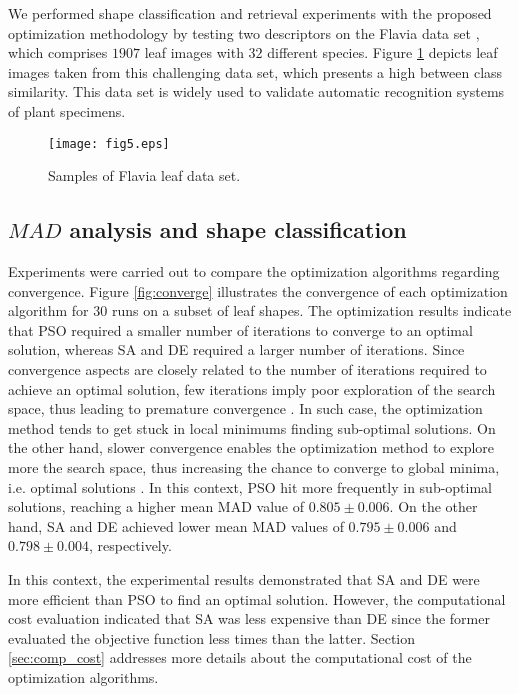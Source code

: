 We performed shape classification and retrieval experiments with the proposed optimization methodology by testing two descriptors on the Flavia data set , which comprises $1907$ leaf images with $32$ different species. Figure \ref{fig:bases} depicts leaf images taken from this challenging data set, which  presents a high between class similarity. This data set is widely used to validate automatic recognition systems of plant specimens. 

\begin{figure}[!htb]
\centering
\texttt{[image: fig5.eps]}
\caption{\label{fig:bases}Samples of Flavia leaf data set.}
\end{figure}

\subsection{$MAD$ analysis and shape classification \label{sec:mad_class}}

Experiments were carried out to compare the optimization algorithms regarding convergence.  Figure \ref{fig:converge} illustrates the convergence of each optimization algorithm for $30$ runs on a subset of leaf shapes. 
The optimization results indicate that PSO required a smaller number of iterations to converge to an optimal solution, whereas SA and DE required a larger number of iterations. Since convergence aspects are closely related
to the number of iterations required to achieve an optimal solution, few iterations imply poor exploration of the search space, thus leading to premature convergence . In such case, the optimization method tends to get stuck in local minimums finding sub-optimal solutions. On the other hand, slower convergence enables the optimization method to explore more the search space, thus increasing the chance to converge to global minima, i.e. optimal solutions . 
In this context, PSO hit more frequently in sub-optimal solutions, reaching a higher mean MAD value of 
$0.805 \pm 0.006$. On the other hand, SA and DE achieved lower mean 
MAD values of $0.795 \pm 0.006$ and $0.798 \pm 0.004$, respectively. 

In this context, the experimental results demonstrated that SA and DE were more efficient than PSO to find an optimal solution. However, the computational cost evaluation indicated that SA was less expensive than DE since the former evaluated the objective function less times than the latter.  Section \ref{sec:comp_cost} addresses more details about the computational cost of the optimization algorithms.

